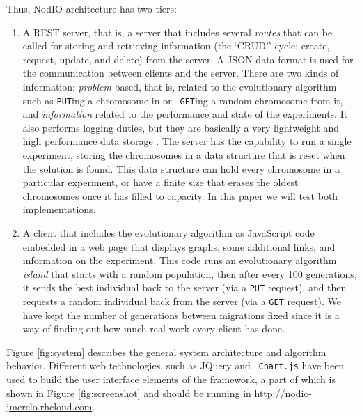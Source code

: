 \documentclass[letterpaper]{article}
\begin{document}
Thus, {\sf NodIO} architecture has two tiers:\begin{enumerate}
\item A REST server, that is, a server that includes several {\em
  routes} 
  that can be called for storing and retrieving information (the `CRUD'' cycle:
  create, request, update, and delete) from the server. 
  A JSON data format is used for the communication between 
  clients and the server. There are two kinds of information:
  {\em problem} based, that is, related to the
  evolutionary algorithm such as {\tt PUT}ing a chromosome in or {\tt
  GET}ing a random chromosome from it, and {\em information} related
  to the performance and state of the experiments. It also performs logging
  duties, but they are basically a very lightweight and high performance
  data storage \citep{jj:idc:lowcost}.
  The server has the capability to
  run a single experiment, storing the chromosomes in a data structure
  that is reset when the solution is found. This data structure can
  hold every chromosome in a particular experiment, or have a finite
  size that erases the oldest chromosomes once it has filled to
  capacity. In this paper we will test both implementations.  
\item A client that includes the evolutionary algorithm as
  JavaScript code embedded in a web page that displays graphs, some
  additional links, and information on the experiment. This code runs
  an evolutionary algorithm {\em island} that starts with a random
  population, then after every 100 generations, it sends the best individual
  back to the server (via a {\tt PUT} request), and then requests a random
  individual back from the server (via a {\tt GET} request). We have
  kept the number of generations between migrations fixed since it is
  a way of finding out how much real work every client has done. 
\end{enumerate}

Figure \ref{fig:system} describes the general system architecture and
algorithm behavior. Different web technologies, such as JQuery and {\tt
  Chart.js} have been used to build the user interface elements of the
framework, a part of which is shown in Figure \ref{fig:screenshot} and
should be running in \url{http://nodio-jmerelo.rhcloud.com}.
\end{document}
